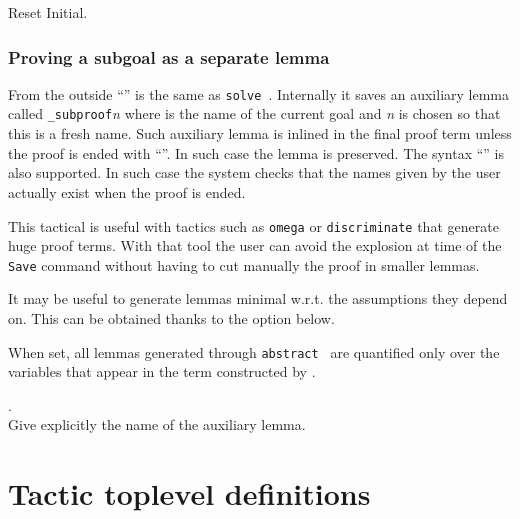 \begin{coq_eval}
Reset Initial.
\end{coq_eval}

\subsubsection[Proving a subgoal as a separate lemma]{Proving a subgoal as a separate lemma
}

From the outside ``{}'' is the same as
{\tt solve \tacexpr}. Internally it saves an auxiliary lemma called 
{\ident}\texttt{\_subproof}\textit{n} where {\ident} is the name of the
current goal and \textit{n} is chosen so that this is a fresh name.
Such auxiliary lemma is inlined in the final proof term
unless the proof is ended with ``{}''.  In such
case the lemma is preserved.  The syntax
``{}''
is also supported.  In such case the system checks that the names given by the
user actually exist when the proof is ended.

This tactical is useful with tactics such as \texttt{omega} or
\texttt{discriminate} that generate huge proof terms. With that tool
the user can avoid the explosion at time of the \texttt{Save} command
without having to cut manually the proof in smaller lemmas.

It may be useful to generate lemmas minimal w.r.t. the assumptions they depend
on. This can be obtained thanks to the option below.

\begin{quote}
{}
\end{quote}

When set, all lemmas generated through \texttt{abstract {\tacexpr}} are
quantified only over the variables that appear in the term constructed by
\texttt{\tacexpr}.

\begin{Variants}
\item {}.\\
  Give explicitly the name of the auxiliary lemma.
\end{Variants}

\ErrMsg {}

\section[Tactic toplevel definitions]{Tactic toplevel definitions}

